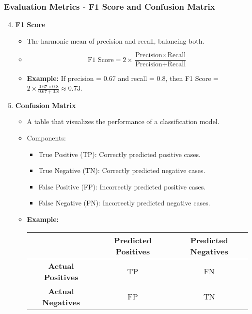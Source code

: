 \documentclass[aspectratio=169]{beamer}
\begin{document}
\begin{frame}[fragile]
    \frametitle{Evaluation Metrics - F1 Score and Confusion Matrix}
    \begin{enumerate}
        \setcounter{enumi}{3}
        \item \textbf{F1 Score}
            \begin{itemize}
                \item The harmonic mean of precision and recall, balancing both.
                \item {}
                \[
                \text{F1 Score} = 2 \times \frac{\text{Precision} \times \text{Recall}}{\text{Precision} + \text{Recall}}
                \]
                \item \textbf{Example:} If precision = 0.67 and recall = 0.8, then F1 Score = \( 2 \times \frac{0.67 \times 0.8}{0.67 + 0.8} \approx 0.73 \).
            \end{itemize}

        \item \textbf{Confusion Matrix}
            \begin{itemize}
                \item A table that visualizes the performance of a classification model.
                \item Components:
                \begin{itemize}
                    \item True Positive (TP): Correctly predicted positive cases.
                    \item True Negative (TN): Correctly predicted negative cases.
                    \item False Positive (FP): Incorrectly predicted positive cases.
                    \item False Negative (FN): Incorrectly predicted negative cases.
                \end{itemize}
                \item \textbf{Example:}
                \begin{center}
                    \begin{tabular}{|c|c|c|}
                        \hline
                        & \textbf{Predicted Positives} & \textbf{Predicted Negatives} \\
                        \hline
                        \textbf{Actual Positives} & TP & FN \\
                        \hline
                        \textbf{Actual Negatives} & FP & TN \\
                        \hline
                    \end{tabular}
                \end{center}
            \end{itemize}
    \end{enumerate}
\end{frame}
\end{document}
